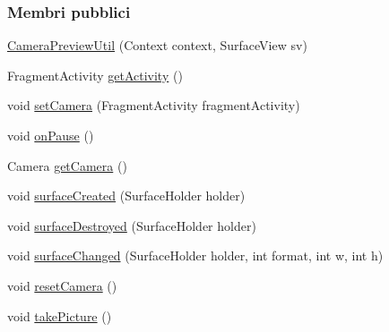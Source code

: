 \subsubsection*{Membri pubblici}
\begin{DoxyCompactItemize}
\item 
\hyperlink{classit_1_1unibo_1_1torsello_1_1bluetoothpositioning_1_1util_1_1CameraPreviewUtil_aa0b929d195ddb472745e4c26d576758e_aa0b929d195ddb472745e4c26d576758e}{Camera\+Preview\+Util} (Context context, Surface\+View sv)
\item 
Fragment\+Activity \hyperlink{classit_1_1unibo_1_1torsello_1_1bluetoothpositioning_1_1util_1_1CameraPreviewUtil_a3a4253aa9b4df3659a6f7bb80be84256_a3a4253aa9b4df3659a6f7bb80be84256}{get\+Activity} ()
\item 
void \hyperlink{classit_1_1unibo_1_1torsello_1_1bluetoothpositioning_1_1util_1_1CameraPreviewUtil_acc49f348e381371fcad9d428ea4a15ca_acc49f348e381371fcad9d428ea4a15ca}{set\+Camera} (Fragment\+Activity fragment\+Activity)
\item 
void \hyperlink{classit_1_1unibo_1_1torsello_1_1bluetoothpositioning_1_1util_1_1CameraPreviewUtil_a69da006b39dff168a1cd185c5aa886f8_a69da006b39dff168a1cd185c5aa886f8}{on\+Pause} ()
\item 
Camera \hyperlink{classit_1_1unibo_1_1torsello_1_1bluetoothpositioning_1_1util_1_1CameraPreviewUtil_a24b83bd2a152f8f12824ccf190a90369_a24b83bd2a152f8f12824ccf190a90369}{get\+Camera} ()
\item 
void \hyperlink{classit_1_1unibo_1_1torsello_1_1bluetoothpositioning_1_1util_1_1CameraPreviewUtil_a88d3e6e94bb5cb4c73e8155e009b6270_a88d3e6e94bb5cb4c73e8155e009b6270}{surface\+Created} (Surface\+Holder holder)
\item 
void \hyperlink{classit_1_1unibo_1_1torsello_1_1bluetoothpositioning_1_1util_1_1CameraPreviewUtil_ab5010e060d99e2808402b40555ba7c1a_ab5010e060d99e2808402b40555ba7c1a}{surface\+Destroyed} (Surface\+Holder holder)
\item 
void \hyperlink{classit_1_1unibo_1_1torsello_1_1bluetoothpositioning_1_1util_1_1CameraPreviewUtil_a1b606e27ab2a6587818cc011dd5ff7f6_a1b606e27ab2a6587818cc011dd5ff7f6}{surface\+Changed} (Surface\+Holder holder, int format, int w, int h)
\item 
void \hyperlink{classit_1_1unibo_1_1torsello_1_1bluetoothpositioning_1_1util_1_1CameraPreviewUtil_a5240e32d2ccac682cf80c639accea5da_a5240e32d2ccac682cf80c639accea5da}{reset\+Camera} ()
\item 
void \hyperlink{classit_1_1unibo_1_1torsello_1_1bluetoothpositioning_1_1util_1_1CameraPreviewUtil_a4f4ca8b7292c4e410f1f5aca3a53423a_a4f4ca8b7292c4e410f1f5aca3a53423a}{take\+Picture} ()
\end{DoxyCompactItemize}
